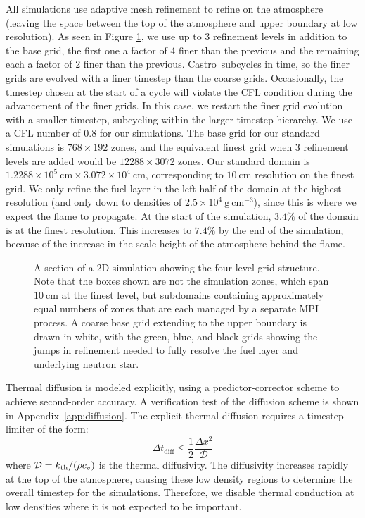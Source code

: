 \documentclass[preprint,times,tighten]{aastex63}
\newcommand{\kth}{k_{\rm th}}
\newcommand{\castro}{{\sf Castro}}
\newcommand{\gcc}{\mathrm{g~cm^{-3} }}
\newcommand{\MarginPar}[1]{
    \marginpar{\vskip-\baselineskip%
               \raggedright%
               \tiny\sffamily%
               {\color{red}\hrule%
               \smallskip%
               #1\par%
               \smallskip%
               \hrule}}%
}
\begin{document}
All simulations use adaptive mesh refinement to refine on the
atmosphere (leaving the space between the top of the atmosphere and
upper boundary at low resolution). As seen in Figure \ref{fig:grids}, 
we use up to 3 refinement levels in addition to the base grid, the first
one a factor of 4 finer than the previous and the remaining each a
factor of 2 finer than the previous. \castro\ subcycles in time, so the 
finer grids are evolved with a finer timestep than the coarse grids. 
Occasionally, the timestep chosen at the start of a cycle will violate
the CFL condition during the advancement of the finer grids. In this
case, we restart the finer grid evolution with a smaller timestep,
subcycling within the larger timestep hierarchy.  We use a CFL number
of 0.8 for our simulations.  
The base grid for our standard
simulations is $768\times 192$ zones, and the equivalent finest grid
when 3 refinement levels are added would be $12288\times 3072$ zones.
Our standard domain is $1.2288\times 10^5~\mathrm{cm} \times
3.072\times 10^4~\mathrm{cm}$, corresponding to $10~\mathrm{cm}$ resolution
on the finest grid.  We only refine the fuel layer in the left half of
the domain at the highest resolution (and only down to densities of
$2.5\times 10^4~\gcc$), since this is where we expect the flame to
propagate.  At the start of the simulation, $3.4\%$ of the domain is
at the finest resolution.  This increases to $7.4\%$ by the end of the
simulation, because of the increase in the scale height of the atmosphere
behind the flame.

\begin{figure}[t]
	\caption{\label{fig:grids}A section of a 2D simulation showing the four-level
		grid structure. Note that the boxes shown are not the simulation zones, which span
		$10~\mathrm{cm}$ at the finest level, but subdomains containing approximately equal
		numbers of zones that are each managed by a separate MPI process. A coarse base grid
		extending to the upper boundary is drawn in white, with the green, blue, and black
		grids showing the jumps in refinement needed to fully resolve the fuel layer and
		underlying neutron star.}
\end{figure}

Thermal diffusion is modeled explicitly, using a predictor-corrector
scheme to achieve second-order accuracy.  A verification test of the
diffusion scheme is shown in Appendix~\ref{app:diffusion}.  The
explicit thermal diffusion requires a timestep limiter of the form:
\begin{equation}
\Delta t_\mathrm{diff} \le \frac{1}{2} \frac{\Delta x^2}{\mathcal{D}}
\end{equation}
where $\mathcal{D} = \kth/(\rho c_v)$ is the thermal diffusivity.  The
diffusivity increases rapidly at the top of the atmosphere, causing
these low density regions to determine the overall timestep for the
simulations.  Therefore, we disable thermal conduction at low
densities where it is not expected to be important.
\end{document}
